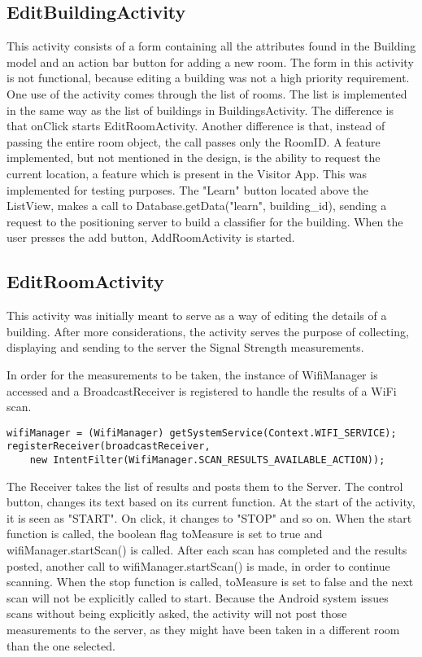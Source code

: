 \subsection{EditBuildingActivity}
This activity consists of a form containing all the attributes found in the Building model and an action bar button for adding a new room. The form in this activity is not functional, because editing a building was not a high priority requirement. 
One use of the activity comes through the list of rooms. The list is implemented in the same way as the list of buildings in BuildingsActivity. The difference is that onClick starts EditRoomActivity. Another difference is that, instead of passing the entire room object, the call passes only the RoomID. A feature implemented, but not mentioned in the design, is the ability to request the current location, a feature which is present in the Visitor App. This was implemented for testing purposes.
The "Learn" button located above the ListView, makes a call to Database.getData("learn", building\_id), sending a request to the positioning server to build a classifier for the building.
When the user presses the add button, AddRoomActivity is started.

\subsection{EditRoomActivity}
This activity was initially meant to serve as a way of editing the details of a building. After more considerations, the activity serves the purpose of collecting, displaying and sending to the server the Signal Strength measurements. 

In order for the measurements to be taken, the instance of WifiManager is accessed and a BroadcastReceiver is registered to handle the results of a WiFi scan.
\begin{lstlisting}
wifiManager = (WifiManager) getSystemService(Context.WIFI_SERVICE);
registerReceiver(broadcastReceiver, 
	new IntentFilter(WifiManager.SCAN_RESULTS_AVAILABLE_ACTION));
\end{lstlisting}
The Receiver takes the list of results and posts them to the Server. The control button, changes its text based on its current function. At the start of the activity, it is seen as "START". On click, it changes to "STOP" and so on. When the start function is called,  the boolean flag toMeasure is set to true and wifiManager.startScan() is called. After each scan has completed and the results posted, another call to wifiManager.startScan() is made, in order to continue scanning. When the stop function is called, toMeasure is set to false and the next scan will not be explicitly called to start. Because the Android system issues scans without being explicitly asked, the activity will not post those measurements to the server, as they might have been taken in a different room than the one selected. 

